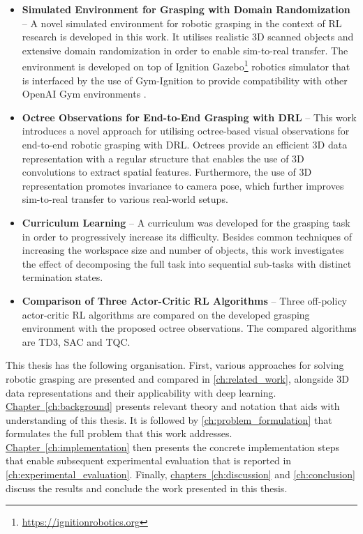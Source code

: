 \begin{itemize}
    \item \textbf{Simulated Environment for Grasping with Domain Randomization} -- A novel simulated environment for robotic grasping in the context of RL research is developed in this work. It utilises realistic 3D scanned objects and extensive domain randomization in order to enable sim-to-real transfer. The environment is developed on top of Ignition Gazebo\footnote{\href{https://ignitionrobotics.org}{https://ignitionrobotics.org}} robotics simulator that is interfaced by the use of Gym-Ignition \cite{ferigo_gym-ignition_2020} to provide compatibility with other OpenAI Gym environments \cite{brockman_openai_2016}.
    \item \textbf{Octree Observations for End-to-End Grasping with DRL} -- This work introduces a novel approach for utilising octree-based visual observations for end-to-end robotic grasping with DRL. Octrees provide an efficient 3D data representation with a regular structure that enables the use of 3D convolutions to extract spatial features. Furthermore, the use of 3D representation promotes invariance to camera pose, which further improves sim-to-real transfer to various real-world setups.
    \item \textbf{Curriculum Learning} -- A curriculum was developed for the grasping task in order to progressively increase its difficulty. Besides common techniques of increasing the workspace size and number of objects, this work investigates the effect of decomposing the full task into sequential sub-tasks with distinct termination states.
    \item \textbf{Comparison of Three Actor-Critic RL Algorithms} -- Three off-policy actor-critic RL algorithms are compared on the developed grasping environment with the proposed octree observations. The compared algorithms are TD3, SAC and TQC.
\end{itemize}

This thesis has the following organisation. First, various approaches for solving robotic grasping are presented and compared in \autoref{ch:related_work}, alongside 3D data representations and their applicability with deep learning. \hyperref[ch:background]{Chapter~\ref*{ch:background}} presents relevant theory and notation that aids with understanding of this thesis. It is followed by \autoref{ch:problem_formulation} that formulates the full problem that this work addresses. \hyperref[ch:implementation]{Chapter~\ref*{ch:implementation}} then presents the concrete implementation steps that enable subsequent experimental evaluation that is reported in \autoref{ch:experimental_evaluation}. Finally, \hyperref[ch:discussion]{chapters~\ref*{ch:discussion}} and \ref{ch:conclusion} discuss the results and conclude the work presented in this thesis.
